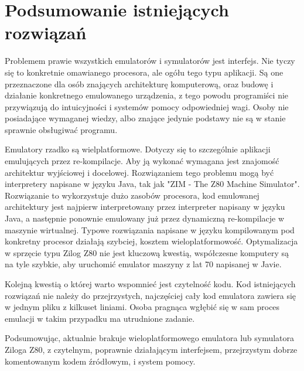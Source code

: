 	
	\section{Podsumowanie istniejących rozwiązań}
	Problemem prawie wszystkich emulatorów i symulatorów jest interfejs. Nie tyczy się to konkretnie omawianego procesora, ale ogółu tego typu aplikacji. Są one przeznaczone dla osób znających architekturę komputerową, oraz budowę i działanie konkretnego emulowanego urządzenia, z tego powodu programiści nie przywiązują do intuicyjności i systemów pomocy odpowiedniej wagi. Osoby nie posiadające wymaganej wiedzy, albo znające jedynie podstawy nie są w stanie sprawnie obsługiwać programu. 
	
	Emulatory rzadko są wielplatformowe. Dotyczy się to szczególnie aplikacji emulujących przez re-kompilacje. Aby ją wykonać wymagana jest znajomość architektur wyjściowej i docelowej. Rozwiązaniem tego problemu mogą być interpretery napisane w języku Java, tak jak "ZIM - The Z80 Machine Simulator". Rozwiązanie to wykorzystuje dużo zasobów procesora, kod emulowanej architektury jest najpierw interpretowany przez interpreter napisany w języku Java, a następnie ponownie emulowany już przez dynamiczną re-kompilacje w maszynie wirtualnej. Typowe rozwiązania napisane w języku kompilowanym pod konkretny procesor działają szybciej, kosztem wieloplatformowość. Optymalizacja w sprzęcie typu Zilog Z80 nie jest kluczową kwestią, współczesne komputery są na tyle szybkie, aby uruchomić emulator maszyny z lat 70 napisanej w Javie. 
	
	Kolejną kwestią o której warto wspomnieć jest czytelność kodu. Kod istniejących rozwiązań nie należy do przejrzystych, najczęściej cały kod emulatora zawiera się w jednym pliku z kilkuset liniami. Osoba pragnąca wgłębić się w sam proces emulacji w takim przypadku ma utrudnione zadanie.
	
	Podsumowując, aktualnie brakuje wieloplatformowego emulatora lub symulatora Ziloga Z80, z czytelnym, poprawnie działającym interfejsem, przejrzystym dobrze komentowanym kodem źródłowym, i system pomocy.
	
	